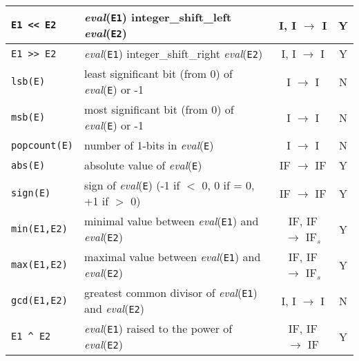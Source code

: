\begin{supertabular}{|l|L{7.5cm}|c|c|}
\hline

\texttt{E1 << E2} & \textit{eval}(\texttt{E1}) integer\_shift\_left
\textit{eval}(\texttt{E2}) & I, I $\rightarrow$ I & Y \\

\hline

\texttt{E1 >> E2} & \textit{eval}(\texttt{E1}) integer\_shift\_right
\textit{eval}(\texttt{E2}) & I, I $\rightarrow$ I & Y \\

\hline

\texttt{lsb(E)} & least significant bit (from 0) of \textit{eval}(\texttt{E}) or -1 & I
$\rightarrow$ I & N \\

\hline

\texttt{msb(E)} & most significant bit (from 0) of \textit{eval}(\texttt{E}) or -1 & I
$\rightarrow$ I & N \\

\hline

\texttt{popcount(E)} & number of 1-bits in \textit{eval}(\texttt{E}) & I
$\rightarrow$ I & N \\

\hline

\texttt{abs(E)} & absolute value of \textit{eval}(\texttt{E}) & IF
$\rightarrow$ IF & Y \\

\hline

\texttt{sign(E)} & sign of \textit{eval}(\texttt{E}) (-1 if $<$ 0, 0 if = 0,
+1 if $>$ 0) & IF $\rightarrow$ IF & Y \\

\hline

\texttt{min(E1,E2)} & minimal value between \textit{eval}(\texttt{E1}) and
\textit{eval}(\texttt{E2}) & IF, IF $\rightarrow$ IF$_s$ & Y \\

\hline

\texttt{max(E1,E2)} & maximal value between \textit{eval}(\texttt{E1}) and
\textit{eval}(\texttt{E2}) & IF, IF $\rightarrow$ IF$_s$ & Y \\

\hline

\texttt{gcd(E1,E2)} & greatest common divisor of \textit{eval}(\texttt{E1}) and
\textit{eval}(\texttt{E2}) & I, I $\rightarrow$ I & N \\

\hline

\texttt{E1 \^{} E2}  & \textit{eval}(\texttt{E1}) raised to the power of
\textit{eval}(\texttt{E2}) & IF, IF $\rightarrow$ IF & Y \\


\end{supertabular}
